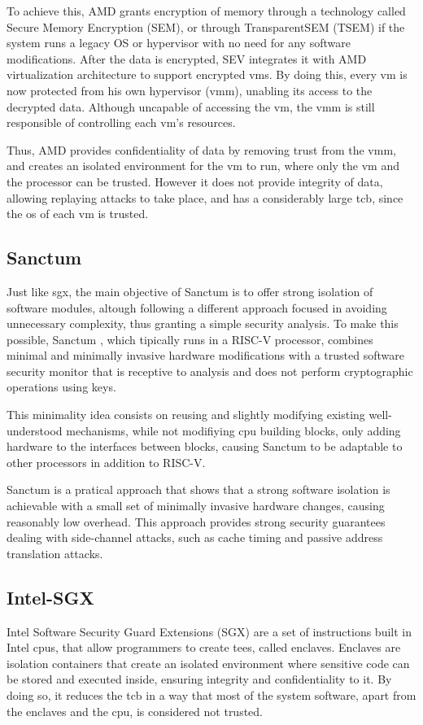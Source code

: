To achieve this, AMD grants encryption of memory through a technology called Secure Memory Encryption (SEM), or through TransparentSEM (TSEM) if the system runs a legacy OS or hypervisor with no need for any software modifications.
After the data is encrypted, SEV integrates it with AMD virtualization architecture to support encrypted \gls{vm}s. By doing this, every \gls{vm} is now protected from his own hypervisor (\gls{vmm}), unabling its access to the decrypted data. Although uncapable of accessing the \gls{vm}, the \gls{vmm} is still responsible of controlling each \gls{vm}'s resources. \cite{amdPaper}

Thus, AMD provides confidentiality of data by removing trust from the \gls{vmm}, and creates an isolated environment for the \gls{vm} to run, where only the \gls{vm} and the processor can be trusted. However it does not provide integrity of data, allowing replaying attacks to take place, and has a considerably large \gls{tcb}, since the \gls{os} of each \gls{vm} is trusted. \cite{amdSEVPaper}

\subsection{Sanctum}
\label{ssec:sanctum}
Just like \gls{sgx}, the main objective of Sanctum is to offer strong isolation of software modules, altough following a different approach focused in avoiding unnecessary complexity, thus granting a simple security analysis.
To make this possible, Sanctum \cite{sanctumPaper}, which tipically runs in a RISC-V processor, combines minimal and minimally invasive hardware modifications with a trusted software security monitor that is receptive to analysis and does not perform cryptographic operations using keys. 

This minimality idea consists on reusing and slightly modifying existing well-understood mechanisms, while not modifiying \gls{cpu} building blocks, only adding hardware to the interfaces between blocks, causing Sanctum to be adaptable to other processors in addition to RISC-V. 

Sanctum is a pratical approach that shows that a strong software isolation is achievable with a small set of minimally invasive hardware changes, causing reasonably low overhead. 
This approach provides strong security guarantees dealing with side-channel attacks, such as cache timing and passive address translation attacks.

\subsection{Intel-SGX}
\label{ssec:intelsgx}
Intel Software Security Guard Extensions (SGX) are a set of instructions built in Intel \gls{cpu}s, that allow programmers to create \gls{tee}s, called enclaves. Enclaves are isolation containers that create an isolated environment where sensitive code can be stored and executed inside, ensuring integrity and confidentiality to it. By doing so, it reduces the \gls{tcb} in a way that most of the system software, apart from the enclaves and the \gls{cpu}, is considered not trusted.

